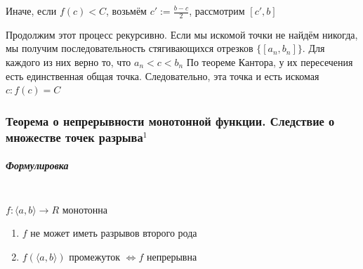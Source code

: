 \documentclass{article}
\let\vanillasubparagraph\subparagraph
\renewcommand{\subparagraph}[1]{\vanillasubparagraph{#1}\mbox{}\\}
\begin{document}
Иначе, если $f(c) < C$, возьмём $c' := \frac{b-c}{2}$, рассмотрим $[c', b]$

Продолжим этот процесс рекурсивно. Если мы искомой точки не найдём никогда, мы получим последовательность стягивающихся отрезков $\{[a_n, b_n]\}$. Для каждого из них верно то, что $a_n < c < b_n$ По теореме Кантора, у их пересечения есть единственная общая точка. Следовательно, эта точка и есть искомая $c : f(c) = C$


\subsubsection{Теорема о непрерывности монотонной функции. Следствие о множестве точек разрыва\texorpdfstring{$^1$}{}}
\label{НепрМонФун}
\subparagraph{Формулировка}
$f: \langle a, b \rangle \rightarrow R$ монотонна

\begin{enumerate}
    \item $f$ не может иметь разрывов второго рода
    \item $f(\langle a, b \rangle)$ промежуток $\Leftrightarrow f$ непрерывна
\end{enumerate}
\end{document}
